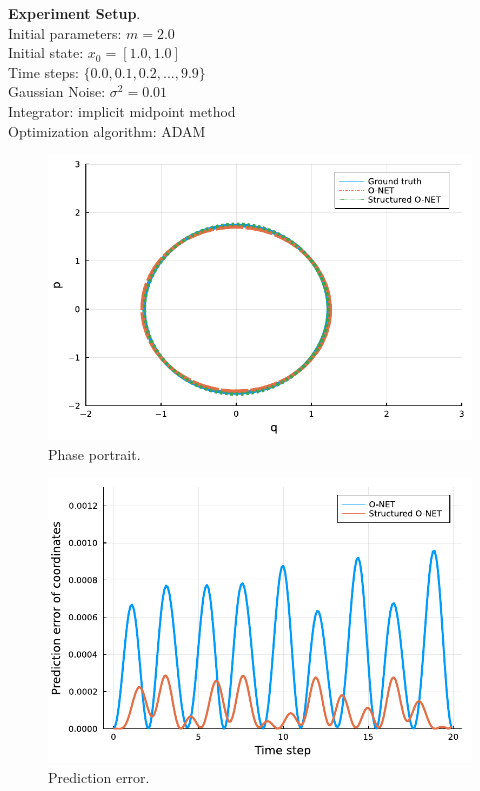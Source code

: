 \documentclass[
	parskip, 			   %
	twoside, 			   %
	DIV=14, 			   %
	BCOR=15.0mm, 		   %
	headsepline, 		   %
	open=right, 		   %
	captions=tableheading, %
	bibliography=totoc,    %
	numbers=noenddot       %
]{scrreprt}
\begin{document}
\textbf{Experiment Setup}.\\
Initial parameters: $m = 2.0$\\
Initial state: $x_0 = [1.0, 1.0]$\\
Time steps: $\{ 0.0, 0.1, 0.2, ..., 9.9 \}$\\
Gaussian Noise: $\sigma^2 = 0.01$\\
Integrator: implicit midpoint method\\
Optimization algorithm: ADAM

\clearpage
\begin{figure}[h!]
    \centering
    \includegraphics[scale=1]{figures/phase_portrait_O_NET.pdf}
    \caption{Phase portrait.}
    \label{fig:phase_portrait_O_NET}
\end{figure}

\begin{figure}[h!]
    \centering
    \includegraphics[scale=1]{figures/prediction_error_structured_O_NET.pdf}
    \caption{Prediction error.}
    \label{fig:prediction_error_structured_O_NET}
\end{figure}
\end{document}
